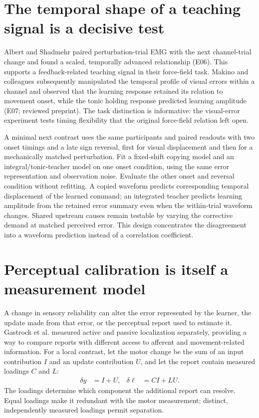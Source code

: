 \documentclass[11pt,a4paper]{article}
\begin{document}
\section{The temporal shape of a teaching signal is a decisive test}
Albert and Shadmehr paired perturbation-trial EMG with the next channel-trial change and found a scaled, temporally advanced relationship (E06). This supports a feedback-related teaching signal in their force-field task. Makino and colleagues subsequently manipulated the temporal profile of visual errors within a channel and observed that the learning response retained its relation to movement onset, while the tonic holding response predicted learning amplitude (E07; reviewed preprint). The task distinction is informative: the visual-error experiment tests timing flexibility that the original force-field relation left open. \cite{albert2016,makino2026}

A minimal next contrast uses the same participants and paired readouts with two onset timings and a late sign reversal, first for visual displacement and then for a mechanically matched perturbation. Fit a fixed-shift copying model and an integral/tonic-teacher model on one onset condition, using the same error representation and observation noise. Evaluate the other onset and reversal condition without refitting. A copied waveform predicts corresponding temporal displacement of the learned command; an integrated teacher predicts learning amplitude from the retained error summary even when the within-trial waveform changes. Shared upstream causes remain testable by varying the corrective demand at matched perceived error. This design concentrates the disagreement into a waveform prediction instead of a correlation coefficient.

\section{Perceptual calibration is itself a measurement model}
A change in sensory reliability can alter the error represented by the learner, the update made from that error, or the perceptual report used to estimate it. Gastrock et al. measured active and passive localization separately, providing a way to compare reports with different access to afferent and movement-related information. For a local contrast, let the motor change be the sum of an input contribution $I$ and an update contribution $U$, and let the report contain measured loadings $C$ and $L$:
\begin{align}\delta y&=I+U, &\delta\ell&=CI+LU.\label{eq:calibration}\end{align}
The loadings determine which component the additional report can resolve. Equal loadings make it redundant with the motor measurement; distinct, independently measured loadings permit separation. \cite{external2020,hayashi2020}
\end{document}
